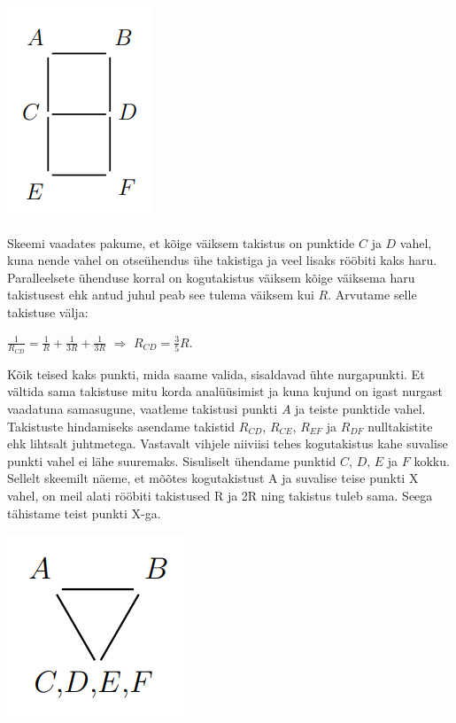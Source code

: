 {\ifSolution
\begin{center}
	\includegraphics[width=0.5\linewidth]{2016-v3p-09-lah1.png}
\end{center}
Skeemi vaadates pakume, et kõige väiksem takistus on punktide $C$ ja $D$ vahel, kuna nende vahel on otseühendus ühe takistiga ja veel lisaks rööbiti kaks haru. Paralleelsete ühenduse korral on kogutakistus väiksem kõige väiksema haru takistusest ehk antud juhul peab see tulema väiksem kui $R$. Arvutame selle takistuse välja:
\begin{center}
$\frac{1}{R_{CD}} = \frac{1}{R} + \frac{1}{3R}+\frac{1}{3R}$ $\Rightarrow$  $R_{CD} = \frac{3}{5}R$.
\end{center}
Kõik teised kaks punkti, mida saame valida, sisaldavad ühte nurgapunkti. Et vältida sama takistuse mitu korda analüüsimist ja kuna kujund on igast nurgast vaadatuna samasugune, vaatleme takistusi punkti $A$ ja teiste punktide vahel. 
Takistuste hindamiseks asendame takistid $R_{CD}$, $R_{CE}$, $R_{EF}$ ja $R_{DF}$ nulltakistite ehk lihtsalt juhtmetega. Vastavalt vihjele niiviisi tehes kogutakistus kahe suvalise punkti vahel ei lähe suuremaks. Sisuliselt ühendame punktid $C$, $D$, $E$ ja $F$ kokku. Sellelt skeemilt näeme, et mõõtes kogutakistust A ja suvalise teise punkti X vahel, on meil alati rööbiti takistused R ja 2R ning takistus tuleb sama. Seega tähistame teist punkti X-ga. 
\begin{center}
	\includegraphics[width=0.5\linewidth]{2016-v3p-09-lah2.png}

\end{center}}
